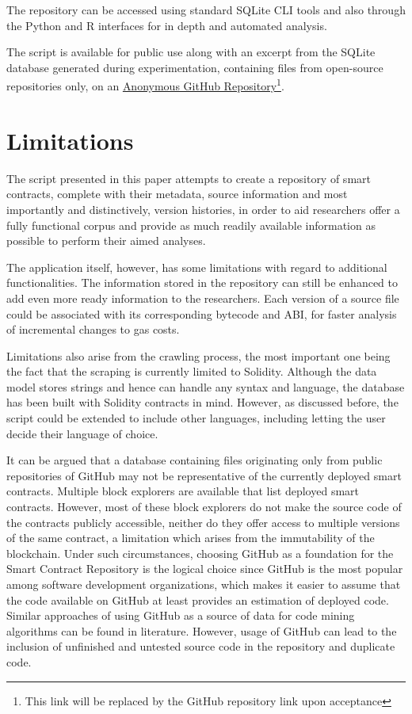 \documentclass[10pt,conference]{IEEEtran}
\begin{document}
	The repository can be accessed using standard SQLite CLI tools and also through the Python and R interfaces for in depth and automated analysis.
	
	The script is available for public use along with an excerpt from the SQLite database generated during experimentation, containing files from open-source repositories only, on an \href{https://anonymous.4open.science/r/github-solidity-scraper-0F26}{Anonymous GitHub Repository}\footnote{This link will be replaced by the GitHub repository link upon acceptance}.
	
	\section{Limitations}
	\label{sec:limitations}
	The script presented in this paper attempts to create a repository of smart contracts, complete with their metadata, source information and most importantly and distinctively, version histories, in order to aid researchers offer a fully functional corpus and provide as much readily available information as possible to perform their aimed analyses. 
	
	The application itself, however, has some limitations with regard to additional functionalities. The information stored in the repository can still be enhanced to add even more ready information to the researchers. Each version of a source file could be associated with its corresponding bytecode and ABI, for faster analysis of incremental changes to gas costs.
	
	Limitations also arise from the crawling process, the most important one being the fact that the scraping is currently limited to Solidity. Although the data model stores strings and hence can handle any syntax and language, the database has been built with Solidity contracts in mind. However, as discussed before, the script could be extended to include other languages, including letting the user decide their language of choice.
	
	It can be argued that a database containing files originating only from public repositories of GitHub may not be representative of the currently deployed smart contracts. Multiple block explorers are available that list deployed smart contracts. However, most of these block explorers do not make the source code of the contracts publicly accessible, neither do they offer access to multiple versions of the same contract, a limitation which arises from the immutability of the blockchain. Under such circumstances, choosing GitHub as a foundation for the Smart Contract Repository is the logical choice since GitHub is the most popular among software development organizations, which makes it easier to assume that the code available on GitHub at least provides an estimation of deployed code. Similar approaches of using GitHub as a source of data for code mining algorithms can be found in literature\cite{schroder, dabic, yang}. However, usage of GitHub can lead to the inclusion of unfinished and untested source code in the repository and duplicate code.
	
\end{document}
